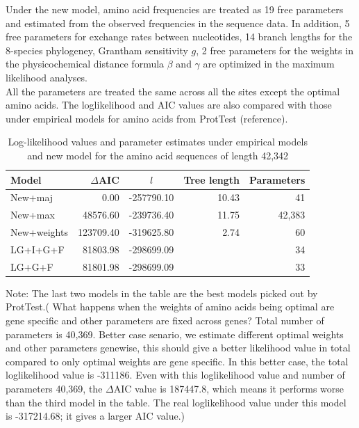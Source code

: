 \documentclass[13pt]{article}
\begin{document}
Under the new model, amino acid frequencies are treated as 19 free parameters and estimated from the observed frequencies in the sequence data.
In addition, 5 free parameters for exchange rates between nucleotides, 14 branch lengths for the 8-species phylogeney, Grantham sensitivity $g$, 2 free parameters for the weights in the physicochemical distance formula $\beta$ and $\gamma$ are optimized in the maximum likelihood analyses.\\


All the parameters are treated the same across all the sites except the optimal amino acids.
The loglikelihood and AIC values are also compared with those under empirical models for amino acids from ProtTest (reference). \\

\begin{table}[h]
\begin{center}
\caption{Log-likelihood values and parameter estimates under empirical models and new model for the amino acid sequences of length 42,342}
\begin{tabular}{l r c r r}
\hline
Model & $\Delta$AIC & $l$ & Tree length & Parameters \\
\hline
New+maj & 0.00 & -257790.10 &  10.43 & 41 \\
New+max & 48576.60 & -239736.40 & 11.75 & 42,383 \\
New+weights & 123709.40 & -319625.80 & 2.74 & 60 \\
LG+I+G+F & 81803.98 & -298699.09 &  & 34\\
LG+G+F & 81801.98 & -298699.09 & & 33 \\
\hline
\end{tabular}
\end{center}

Note: The last two models in the table are the best models picked out by ProtTest.({\color{blue} What happens when the weights of amino acids being optimal are gene specific and other parameters are fixed across genes? Total number of parameters is 40,369.
Better case senario, we estimate different optimal weights and other parameters genewise, this should give a better likelihood value in total compared to only optimal weights are gene specific.
In this better case, the total loglikelihood value is -311186.
Even with this loglikelihood value and number of parameters 40,369, the $\Delta$AIC value is 187447.8, which means it performs worse than the third model in the table.} The real loglikelihood value under this model is -317214.68; it gives a larger AIC value.)
\label{table:mle}
\end{table}
\end{document}
